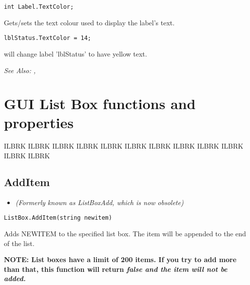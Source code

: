 \begin{verbatim}
int Label.TextColor;
\end{verbatim}
Gets/sets the text colour used to display the label's text.

\begin{verbatim}
lblStatus.TextColor = 14;
\end{verbatim}

will change label 'lblStatus' to have yellow text.

\it{See Also:} , 



\section{GUI List Box functions and properties}%

ILBRK
ILBRK
ILBRK
ILBRK
ILBRK
ILBRK
ILBRK
ILBRK
ILBRK
ILBRK
ILBRK
ILBRK


\subsection{AddItem}\label{ListBox.AddItem}%

\begin{itemize}
\item \it{(Formerly known as ListBoxAdd, which is now obsolete)}
\end{itemize}

\begin{verbatim}
ListBox.AddItem(string newitem)
\end{verbatim}
Adds NEWITEM to the specified list box. The item will be appended to
the end of the list.

\bf{NOTE:} List boxes have a limit of 200 items. If you try to add more than that,
this function will return \it{false} and the item will not be added.


